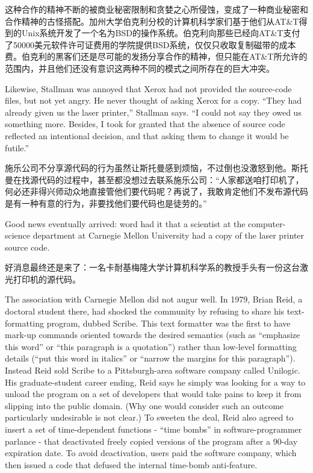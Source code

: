 \ifdefined\chs
这种合作的精神不断的被商业秘密限制和贪婪之心所侵蚀，变成了一种商业秘密和合作精神的古怪搭配。加州大学伯克利分校的计算机科学家们基于他们从AT\&T得到的Unix系统开发了一个名为BSD的操作系统。伯克利向那些已经向AT\&T支付了50000美元软件许可证费用的学院提供BSD系统，仅仅只收取复制磁带的成本费。伯克利的黑客们还是尽可能的发扬分享合作的精神，但只能在AT\&T所允许的范围内，并且他们还没有意识这两种不同的模式之间所存在的巨大冲突。
\fi

\ifdefined\eng
Likewise, Stallman was annoyed that Xerox had not provided the source-code files, but not yet angry. He never thought of asking Xerox for a copy. ``They had already given us the laser printer,'' Stallman says. ``I could not say they owed us something more. Besides, I took for granted that the absence of source code reflected an intentional decision, and that asking them to change it would be futile.''
\fi

\ifdefined\chs
施乐公司不分享源代码的行为虽然让斯托曼感到烦恼，不过倒也没激怒到他。斯托曼在找源代码的过程中，甚至都没想过去联系施乐公司：``人家都送咱打印机了，何必还非得兴师动众地直接管他们要代码呢？再说了，我敢肯定他们不发布源代码是有一种有意的行为，非要找他们要代码也是徒劳的。''
\fi

\ifdefined\eng
Good news eventually arrived: word had it that a scientist at the computer-science department at Carnegie Mellon University had a copy of the laser printer source code.
\fi

\ifdefined\chs
好消息最终还是来了：一名卡耐基梅隆大学计算机科学系的教授手头有一份这台激光打印机的源代码。
\fi

\ifdefined\eng
The association with Carnegie Mellon did not augur well. In 1979, Brian Reid, a doctoral student there, had shocked the community by refusing to share his text-formatting program, dubbed Scribe. This text formatter was the first to have mark-up commands oriented towards the desired semantics (such as ``emphasize this word'' or ``this paragraph is a quotation'') rather than low-level formatting details (``put this word in italics'' or ``narrow the margins for this paragraph''). Instead Reid sold Scribe to a Pittsburgh-area software company called Unilogic. His graduate-student career ending, Reid says he simply was looking for a way to unload the program on a set of developers that would take pains to keep it from slipping into the public domain. (Why one would consider such an outcome particularly undesirable is not clear.) To sweeten the deal, Reid also agreed to insert a set of time-dependent functions - ``time bombs'' in software-programmer parlance - that deactivated freely copied versions of the program after a 90-day expiration date. To avoid deactivation, users paid the software company, which then issued a code that defused the internal time-bomb anti-feature.
\fi

